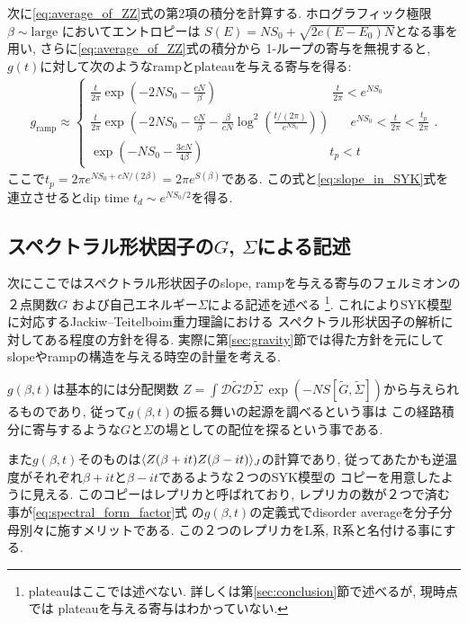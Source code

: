 次に\eqref{eq:average_of_ZZ}式の第2項の積分を計算する. 
ホログラフィック極限$\beta \sim \mathrm{large}$ においてエントロピーは
$S(E) = NS_0 + \sqrt{2c(E-E_0)N}$となる事を用い, さらに\eqref{eq:average_of_ZZ}式の積分から
1-ループの寄与を無視すると, $g(t)$に対して次のようなrampとplateauを与える寄与を得る:
\begin{align}
	g_{\mathrm{ramp}}\approx\left\{
		\begin{array}{l}
			\frac{t}{2\pi}\exp\left(-2NS_0 - \frac{cN}{\beta}\right)
				\hspace{110pt}\frac{t}{2\pi} < e^{NS_0}\\
			\frac{t}{2\pi}\exp\left(-2NS_0 - \frac{cN}{\beta}
			- \frac{\beta}{cN}\log^2\left(\frac{t/(2\pi)}{e^{NS_0}}\right)\right)
				\hspace{20pt}e^{NS_0} < \frac{t}{2\pi} < \frac{t_p}{2\pi}\\
			\exp\left(-NS_0 - \frac{3cN}{4\beta}\right)
				\hspace{120pt}t_p < t
		\end{array}		
	\right. .
	\label{eq:SYK_ramp_and_plateau_contribution}
\end{align}
ここで$t_p = 2\pi e^{NS_0 + cN/(2\beta)} = 2\pi e^{S(\beta)}$である. 
この式と\eqref{eq:slope_in_SYK}式を連立させるとdip time $t_d \sim e^{NS_0/2}$を得る. 

\subsection{スペクトラル形状因子の$G$, $\Sigma$による記述}
次にここではスペクトラル形状因子のslope, rampを与える寄与のフェルミオンの２点関数$G$
および自己エネルギー$\Sigma$による記述を述べる
\footnote{plateauはここでは述べない. 詳しくは第\ref{sec:conclusion}節で述べるが, 現時点では
plateauを与える寄与はわかっていない. }. 
これによりSYK模型に対応するJackiw--Teitelboim重力理論における
スペクトラル形状因子の解析に対してある程度の方針を得る. 
実際に第\ref{sec:gravity}節では得た方針を元にしてslopeやrampの構造を与える時空の計量を考える. 

$g(\beta, t)$は基本的には分配関数
$Z = \int \mathcal{D}\tilde{G}\mathcal{D}\tilde{\Sigma}\ 
\exp(-NS[\tilde{G}, \tilde{\Sigma}])$から与えられるものであり, 
従って$g(\beta, t)$の振る舞いの起源を調べるという事は
この経路積分に寄与するような$G$と$\Sigma$の場としての配位を探るという事である. 

また$g(\beta, t)$そのものは$\langle Z(\beta + it)Z(\beta - it) \rangle_J$の計算であり, 
従ってあたかも逆温度がそれぞれ$\beta + it$と$\beta - it$であるような２つのSYK模型の
コピーを用意したように見える. 
このコピーはレプリカと呼ばれており, レプリカの数が２つで済む事が\eqref{eq:spectral_form_factor}式
の$g(\beta, t)$の定義式でdisorder averageを分子分母別々に施すメリットである. 
この２つのレプリカをL系, R系と名付ける事にする. 

